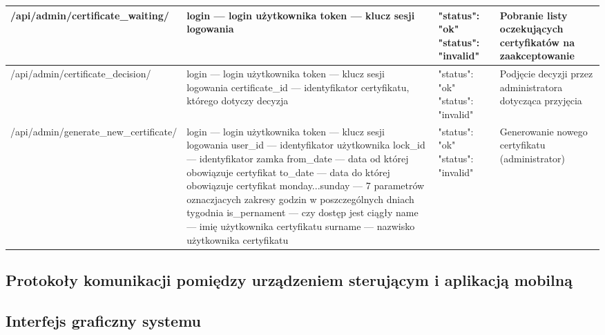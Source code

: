 \begin{landscape}
\begin{longtable}[!ht]{|m{5cm}|m{6cm}|m{6.5cm}|m{3cm}|}
		/api/admin/certificate\_waiting/ & login --- login użytkownika \newline token --- klucz sesji logowania & "status": "ok" \tablinia "status": "invalid" & Pobranie listy oczekujących certyfikatów na zaakceptowanie \\ \hline
		/api/admin/certificate\_decision/ & login --- login użytkownika \newline token --- klucz sesji logowania \newline certificate\_id --- identyfikator certyfikatu, którego dotyczy decyzja & "status": "ok" \tablinia "status": "invalid" & Podjęcie decyzji przez administratora dotycząca przyjęcia \\ \hline
		/api/admin/\linebreak generate\_new\_certificate/ & login --- login użytkownika \newline token --- klucz sesji logowania \newline user\_id --- identyfikator użytkownika \newline lock\_id --- identyfikator zamka \newline from\_date --- data od której obowiązuje certyfikat \newline to\_date --- data do której obowiązuje certyfikat \newline monday...sunday --- 7 parametrów oznaczjacych zakresy godzin w poszczególnych dniach tygodnia \newline is\_pernament --- czy dostęp jest ciągły \newline name --- imię użytkownika certyfikatu \newline surname --- nazwisko użytkownika certyfikatu & "status": "ok" \tablinia "status": "invalid" & Generowanie nowego certyfikatu (administrator) \\ \hline
		
	\end{longtable}
\end{landscape}
	
\newpage
\subsection{Protokoły komunikacji pomiędzy urządzeniem \newline sterującym i aplikacją mobilną}

\newpage
\subsection{Interfejs graficzny systemu}

